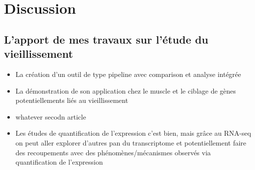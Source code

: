 \setcounter{chapter}{5}
\setcounter{section}{0}
\setcounter{figure}{0}   
\chapter*{Discussion}         %

\section{L'apport de mes travaux sur l'étude du vieillissement}

\begin{itemize}
    \item La création d'un outil de type pipeline avec comparison et analyse intégrée
    \item La démonstration de son application chez le muscle et le ciblage de gènes potentiellements liés au vieillissement
    \item whatever secodn article
    \item Les études de quantification de l'expression c'est bien, mais grâce au RNA-seq on peut aller explorer d'autres pan du transcriptome et potentiellement faire des recoupements avec des phénomènes/mécanismes observés via quantification de l'expression
\end{itemize}

